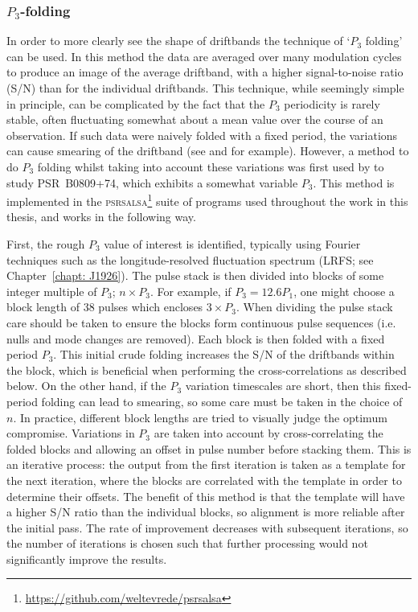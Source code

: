 \subsubsection{\texorpdfstring{$P_3$-folding}{P3-folding}}
\label{sec: intro - emission models - single pulse phenomena - P3 folding}

In order to more clearly see the shape of driftbands the technique of `$P_3$ folding' can be used. In this method the data are averaged over many modulation cycles to produce an image of the average driftband, with a higher signal-to-noise ratio (S/N) than for the individual driftbands. This technique, while seemingly simple in principle, can be complicated by the fact that the $P_3$ periodicity is rarely stable, often fluctuating somewhat about a mean value over the course of an observation. If such data were naively folded with a fixed period, the variations can cause smearing of the driftband (see \citealt{DRxx2001} and \citealt{LKR+2002} for example). However, a method to do $P_3$ folding whilst taking into account these variations was first used by \citet{HSW+2013} to study PSR~B0809+74, which exhibits a somewhat variable $P_3$. This method is implemented in the \textsc{psrsalsa}\footnote{\url{https://github.com/weltevrede/psrsalsa}} suite of programs \citep{Wxxx2016} used throughout the work in this thesis, and works in the following way.

First, the rough $P_3$ value of interest is identified, typically using Fourier techniques such as the longitude-resolved fluctuation spectrum (LRFS; see Chapter~\ref{chapt: J1926}). The pulse stack is then divided into blocks of some integer multiple of $P_3$; $n\times P_3$. For example, if $P_3 = 12.6 P_1$, one might choose a block length of 38 pulses which encloses $ 3\times P_3$. When dividing the pulse stack care should be taken to ensure the blocks form continuous pulse sequences (i.e. nulls and mode changes are removed). Each block is then folded with a fixed period $P_3$. This initial crude folding increases the S/N of the driftbands within the block, which is beneficial when performing the cross-correlations as described below. On the other hand, if the $P_3$ variation timescales are short, then this fixed-period folding can lead to smearing, so some care must be taken in the choice of $n$. In practice, different block lengths are tried to visually judge the optimum compromise. Variations in $P_3$ are taken into account by cross-correlating the folded blocks and allowing an offset in pulse number before stacking them. This is an iterative process: the output from the first iteration is taken as a template for the next iteration, where the blocks are correlated with the template in order to determine their offsets. The benefit of this method is that the template will have a higher S/N ratio than the individual blocks, so alignment is more reliable after the initial pass. The rate of improvement decreases with subsequent iterations, so the number of iterations is chosen such that further processing would not significantly improve the results.

